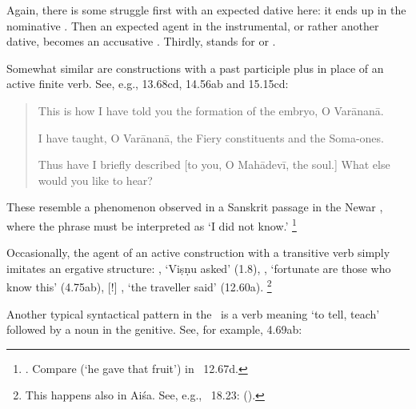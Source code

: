 \noindent
Again, there is some struggle first with an expected dative here:
it ends up in the nominative . Then an expected 
agent in the instrumental, or rather another dative, 
becomes an accusative . Thirdly,
 stands for  or
. 

Somewhat similar are constructions with a 
past participle plus 
in place of an active finite verb. See, e.g.,
13.68cd, 14.56ab and 15.15cd:

\begin{quote}

            This is how I have told you the formation of 
            the embryo, O Varānanā.
            

			I have taught, O Varānanā, the Fiery constituents 
			and the Soma-ones.
			

		Thus have I briefly described [to you, O Mahādevī, the soul.] 
		What else would you like to hear?
\end{quote}

\noindent
These resemble a phenomenon \citeauthor{JorgensenVicitra}
observed in a Sanskrit passage in the Newar
\VicitraKAU, where the phrase \label{najnatoham} must be interpreted
as `I did not know.'%
		\footnote{.\label{najnatohamfn}
						Compare  (`he gave that fruit') in \VSS\ 12.67d.}


Occasionally, the agent of an active construction with a transitive verb
simply imitates an ergative structure: 
, `Viṣṇu asked' (1.8),
, `fortunate are those who know this' (4.75ab),
[!] , `the traveller said' (12.60a).%
		\footnote{This happens also in Aiśa. See, e.g., \SiddhYogMata\ 18.23: 
		 ().}

\label{tellplusgen}Another typical syntactical pattern in the \VSS\ is a verb
meaning `to tell, teach' followed by a noun in the genitive. See, for example, 4.69ab:


